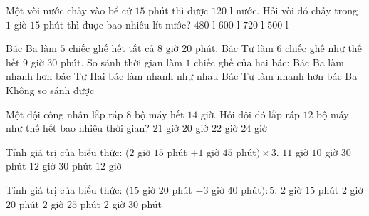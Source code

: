\begin{ex} %
Một vòi nước chảy vào bể cứ $15$ phút thì được $120\text{ l}$ nước. Hỏi vòi đó chảy trong $1$ giờ $15$ phút thì được bao nhiêu lít nước?
\choice
{$480\text{ l}$}
{\True $600\text{ l}$}
{$720\text{ l}$}
{$500\text{ l}$}
\end{ex}

\begin{ex} %
Bác Ba làm $5$ chiếc ghế hết tất cả $8$ giờ $20$ phút. Bác Tư làm $6$ chiếc ghế như thế hết $9$ giờ $30$ phút. So sánh thời gian làm $1$ chiếc ghế của hai bác:
\choice
{Bác Ba làm nhanh hơn bác Tư}
{Hai bác làm nhanh như nhau}
{\True Bác Tư làm nhanh hơn bác Ba}
{Không so sánh được}
\end{ex}

\begin{ex} %
Một đội công nhân lắp ráp $8$ bộ máy hết $14$ giờ. Hỏi đội đó lắp ráp $12$ bộ máy như thế hết bao nhiêu thời gian?
\choice
{\True $21$ giờ}
{$20$ giờ}
{$22$ giờ}
{$24$ giờ}
\end{ex}

\begin{ex} %
Tính giá trị của biểu thức: $(2$ giờ $15$ phút $+ 1$ giờ $45$ phút$) \times 3$.
\choice
{$11$ giờ}
{$10$ giờ $30$ phút}
{$12$ giờ $30$ phút}
{\True $12$ giờ}
\end{ex}

\begin{ex} %
Tính giá trị của biểu thức: $(15$ giờ $20$ phút $- 3$ giờ $40$ phút$) : 5$.
\choice
{$2$ giờ $15$ phút}
{\True $2$ giờ $20$ phút}
{$2$ giờ $25$ phút}
{$2$ giờ $30$ phút}
\end{ex}

